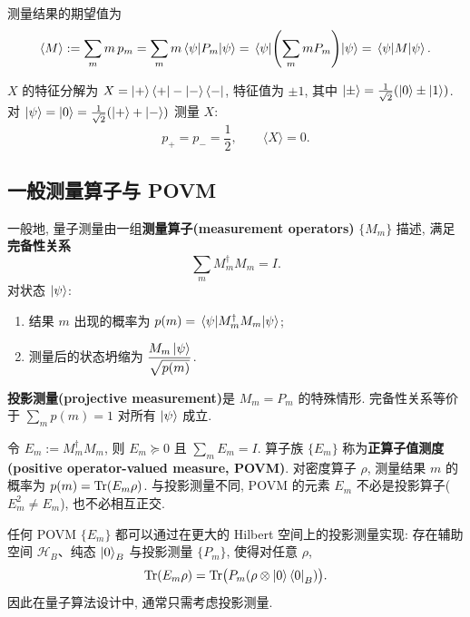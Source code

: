 \documentclass[utf8]{article} %
\numberwithin{equation}{section}   %
\newtheorem{Def}{\hskip 2em {\color{green} 定义}}[subsection]
\newtheorem{Thm}{\hskip 2em {\color{blue} 定理}}[subsection]
\newtheorem{Cor}{\hskip 2em {\color{cyan} 推论}}[subsection]
\newtheorem{Eg}{\hskip 2em {\color{black} 例}}[subsection]
\begin{document}
\begin{Cor}[期望值]
    测量结果的期望值为
    \begin{equation}
        \langle M \rangle := \sum_m m\, p_m = \sum_m m \mel{\psi}{P_m}{\psi}
        = \mel{\psi}{\left(\sum_m m P_m\right)}{\psi} = \mel{\psi}{M}{\psi}.
    \end{equation}
\end{Cor}

\begin{Eg}[测量 Pauli-$X$]
    $X$ 的特征分解为 $X = \ket{+}\bra{+} - \ket{-}\bra{-}$, 特征值为 $\pm 1$,
    其中 $\ket{\pm} = \frac{1}{\sqrt{2}}(\ket{0} \pm \ket{1})$.
    对 $\ket{\psi} = \ket{0} = \frac{1}{\sqrt{2}}(\ket{+} + \ket{-})$ 测量 $X$:
    \[ p_{+} = p_{-} = \frac{1}{2}, \qquad \langle X \rangle = 0. \]
\end{Eg}

\subsection{一般测量算子与 POVM}

\begin{Thm}
    一般地, 量子测量由一组\textbf{测量算子(measurement operators)} $\{M_m\}$ 描述,
    满足\textbf{完备性关系}
    \begin{equation}
        \sum_m M_m^\dagger M_m = I.
    \end{equation}
    对状态 $\ket{\psi}$:
    \begin{enumerate}
        \item 结果 $m$ 出现的概率为 $p(m) = \mel{\psi}{M_m^\dagger M_m}{\psi}$;
        \item 测量后的状态坍缩为 $\dfrac{M_m \ket{\psi}}{\sqrt{p(m)}}$.
    \end{enumerate}
    \textbf{投影测量(projective measurement)}是 $M_m = P_m$ 的特殊情形. 完备性关系等价于 $\sum_m p(m) = 1$ 对所有 $\ket{\psi}$ 成立.
\end{Thm}

\begin{Def}[POVM]
    令 $E_m := M_m^\dagger M_m$, 则 $E_m \succeq 0$ 且 $\sum_m E_m = I$.
    算子族 $\{E_m\}$ 称为\textbf{正算子值测度(positive operator-valued measure, POVM)}.
    对密度算子 $\rho$, 测量结果 $m$ 的概率为 $p(m) = \Tr(E_m \rho)$.
    与投影测量不同, POVM 的元素 $E_m$ 不必是投影算子($E_m^2 \neq E_m$), 也不必相互正交.
\end{Def}

\begin{Thm}
    任何 POVM $\{E_m\}$ 都可以通过在更大的 Hilbert 空间上的投影测量实现:
    存在辅助空间 $\mathcal{H}_B$、纯态 $\ket{0}_B$ 与投影测量 $\{P_m\}$, 使得对任意 $\rho$,
    \[ \Tr(E_m \rho) = \Tr\!\big(P_m (\rho \otimes \ket{0}\bra{0}_B)\big). \]
    因此在量子算法设计中, 通常只需考虑投影测量.
\end{Thm}
\end{document}
